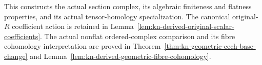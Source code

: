 \begin{remark}
\label{rmk:kn-derived-projective-coordinate-complex-scope}
This constructs the actual section complex, its algebraic
finiteness and flatness properties, and its actual tensor-homology
specialization.  The canonical original-$R$ coefficient action is
retained in Lemma~\ref{lem:kn-derived-original-scalar-coefficients}.
The actual nonflat ordered-complex comparison and its fibre
cohomology interpretation are proved in
Theorem~\ref{thm:kn-geometric-cech-base-change} and
Lemma~\ref{lem:kn-derived-geometric-fibre-cohomology}.
\end{remark}
